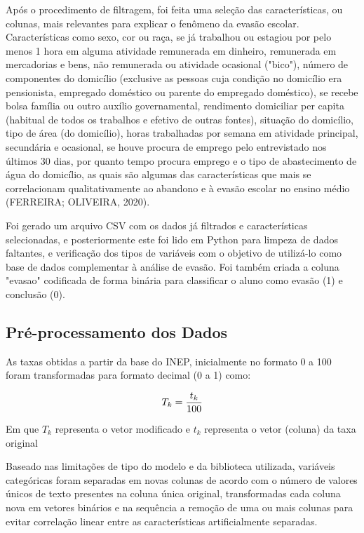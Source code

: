 \documentclass[english, spanish, brazilian]{RBIEarticle} %
\begin{document}
Após o procedimento de filtragem, foi feita uma seleção das características, ou colunas, mais relevantes para explicar o fenômeno da evasão escolar. Características como sexo, cor ou raça, se já trabalhou ou estagiou por pelo menos 1 hora em alguma atividade remunerada em dinheiro, remunerada em mercadorias e bens, não remunerada ou atividade ocasional ("bico"), número de componentes do domicílio (exclusive as pessoas cuja condição no domicílio era pensionista, empregado doméstico ou parente do empregado doméstico), se recebe bolsa família ou outro auxílio governamental, rendimento domiciliar per capita
(habitual de todos os trabalhos e efetivo de outras fontes), situação do domicílio, tipo de área (do domicílio), horas trabalhadas por semana em atividade principal, secundária e ocasional, se houve procura de emprego pelo entrevistado nos últimos 30 dias, por quanto tempo procura emprego e o tipo de abastecimento de água do domicílio, as quais são algumas das características que mais se correlacionam qualitativamente ao abandono e à evasão escolar no ensino médio (FERREIRA; OLIVEIRA, 2020).

Foi gerado um arquivo CSV com os dados já filtrados e características selecionadas, e posteriormente este foi lido em Python para limpeza de dados faltantes, e verificação dos tipos de variáveis com o objetivo de utilizá-lo como base de dados complementar à análise de evasão. Foi também criada a coluna "evasao" codificada de forma binária para classificar o aluno como evasão (1) e conclusão (0).


\subsection{Pré-processamento dos Dados}
As taxas obtidas a partir da base do INEP, inicialmente no formato 0 a 100 foram transformadas para formato decimal (0 a 1) como:

\vspace{0.5cm}
\begin{equation}
\large T_k = \frac{t_k}{100}
\end{equation}
\vspace{0.5cm}

Em que $T_k$ representa o vetor modificado e $t_k$ representa o vetor (coluna) da taxa original

Baseado nas limitações de tipo do modelo e da biblioteca utilizada, variáveis categóricas foram separadas em novas colunas de acordo com o número de valores únicos de texto presentes na coluna única original, transformadas cada coluna nova em vetores binários e na sequência a remoção de uma ou mais colunas para evitar correlação linear entre as características artificialmente separadas.  
\end{document}
